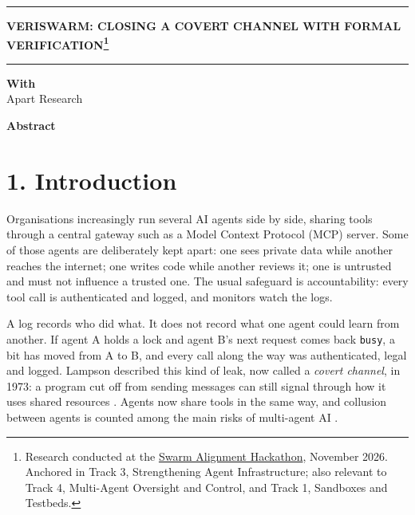 \documentclass[11pt,letterpaper]{article}
\newcommand{\code}[1]{{\small\texttt{#1}}}
\begin{document}
\thispagestyle{empty}

\noindent\rule{\textwidth}{3pt}\par
\vspace{8pt}
\begin{center}
  {\fontsize{20}{24}\selectfont\bfseries VERISWARM: CLOSING A COVERT CHANNEL WITH FORMAL VERIFICATION\footnote{Research conducted at the \href{https://apartresearch.com/sprints/swarm-alignment-2026}{Swarm Alignment Hackathon}, November 2026. Anchored in Track 3, Strengthening Agent Infrastructure; also relevant to Track 4, Multi-Agent Oversight and Control, and Track 1, Sandboxes and Testbeds.}\par}
\end{center}
\vspace{2pt}
\noindent\rule{\textwidth}{0.6pt}\par
\vspace{6pt}
\begin{center}
  \authorgrid\par
  \vspace{6pt}
  {\bfseries With}\\
  Apart Research
\end{center}
\vspace{2pt}
\begin{center}{\fontsize{14}{17}\selectfont\bfseries Abstract}\end{center}
\vspace{-6pt}
\begin{center}
\begin{minipage}{0.76\textwidth}

\end{minipage}
\end{center}

\section{1. Introduction}

Organisations increasingly run several AI agents side by side, sharing tools through a central gateway such as a Model Context Protocol (MCP) server. Some of those agents are deliberately kept apart: one sees private data while another reaches the internet; one writes code while another reviews it; one is untrusted and must not influence a trusted one. The usual safeguard is accountability: every tool call is authenticated and logged, and monitors watch the logs.

A log records who did what. It does not record what one agent could learn from another. If agent A holds a lock and agent B's next request comes back \code{busy}, a bit has moved from A to B, and every call along the way was authenticated, legal and logged. Lampson described this kind of leak, now called a \emph{covert channel}, in 1973: a program cut off from sending messages can still signal through how it uses shared resources \cite{lampson1973}. Agents now share tools in the same way, and collusion between agents is counted among the main risks of multi-agent AI \cite{hammond2025}.
\end{document}

